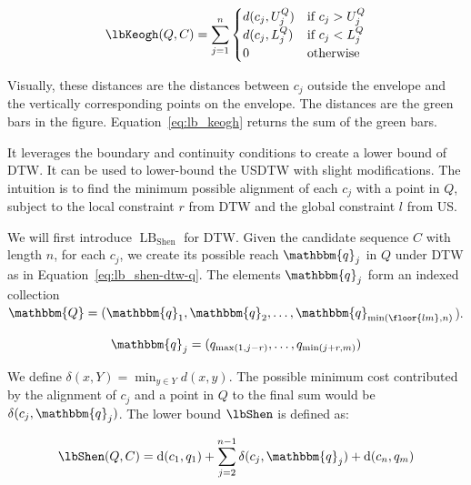 \begin{equation} 
    \label{eq:lb_keogh}
    \lbKeogh(Q,C) = \sum_{j=1}^{n}
    \begin{cases}
        d(c_j, U_j^Q) & \text{if } c_j > U_j^Q\\
        d(c_j, L_j^Q) & \text{if } c_j < L_j^Q\\
        0 & \text{otherwise}\\    
    \end{cases}
\end{equation}

Visually, these distances are the distances between $c_j$ outside the envelope and the vertically corresponding points on the envelope.
The distances are the green bars in the figure.
Equation~\ref{eq:lb_keogh} returns the sum of the green bars.

\noindent{} It leverages the boundary and continuity conditions to create a lower bound of DTW. 
It can be used to lower-bound the USDTW with slight modifications.
The intuition is to find the minimum possible alignment of each $c_j$ with a point in $Q$, subject to the local constraint $r$ from DTW and the global constraint $l$ from US.

We will first introduce $\operatorname{LB}_\mathrm{Shen}$ for DTW.
Given the candidate sequence $C$ with length $n$, 
for each $c_j$, we create its possible reach $\mathbbm{q}_j$ in $Q$ under DTW as in Equation~\ref{eq:lb_shen-dtw-q}.
The elements $\mathbbm{q}_j$ form an indexed collection $\mathbbm{Q} = (\mathbbm{q}_1, \mathbbm{q}_2, \dots, \mathbbm{q}_{\min(\floor{lm}, n)}$).

\begin{equation} 
    \label{eq:lb_shen-dtw-q}
    \mathbbm{q}_j = (q_{\max(1, j-r)}, \ldots, q_{\min(j + r, m)})
\end{equation}

We define $\delta(x, Y) = \min_{y \in Y}d(x, y)$.
The possible minimum cost contributed by the alignment of $c_j$ and a point in $Q$ to the final sum would be $\delta(c_j, \mathbbm{q}_j)$.
The lower bound $\lbShen$ is defined as:

\begin{equation}
    \label{eq:lb_shen-dtw}
    \lbShen(Q, C) = \operatorname{d}(c_1, q_1) + \sum_{j=2}^{n-1} \delta(c_j, \mathbbm{q}_j) + \operatorname{d}(c_n, q_m)
\end{equation}

